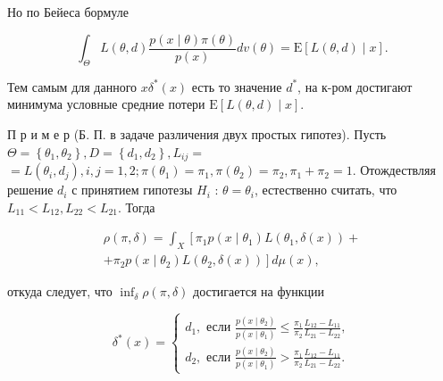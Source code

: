 \documentclass[10pt]{article}
\begin{document}
Но по Бейеса бормуле



\[

\int_{\Theta} L(\theta, d) \frac{p(x \mid \theta) \pi(\theta)}{p(x)} d v(\theta)=\mathrm{E}[L(\theta, d) \mid x] .

\]



Тем самым для данного $x \delta^{*}(x)$ есть то значение $d^{*}$, на к-ром достигают минимума условные средние потери $\mathrm{E}[L(\theta, d) \mid x]$.



П р и м е р (Б. П. в задаче различения двух простых гипотез). Пусть $\Theta=\left\{\theta_{1}, \theta_{2}\right\}, D=\left\{d_{1}, d_{2}\right\}, L_{i j}=$ $=L\left(\theta_{i}, d_{j}\right), i, j=1,2 ; \pi\left(\theta_{1}\right)=\pi_{1}, \pi\left(\theta_{2}\right)=\pi_{2}, \pi_{1}+\pi_{2}=1$. Отождествляя решение $d_{i}$ с принятием гипотезы $H_{i}$ : $\theta=\theta_{i}$, естественно считать, что $L_{11}<L_{12}, L_{22}<L_{21}$. Тогда



\[

\begin{gathered}

\rho(\pi, \delta)=\int_{X}\left[\pi_{1} p\left(x \mid \theta_{1}\right) L\left(\theta_{1}, \delta(x)\right)+\right. \\

\left.+\pi_{2} p\left(x \mid \theta_{2}\right) L\left(\theta_{2}, \delta(x)\right)\right] d \mu(x),

\end{gathered}

\]



откуда следует, что $\inf _{\delta} \rho(\pi, \delta)$ достигается на функции



\[

\delta^{*}(x)=\left\{\begin{array}{l}

d_{1}, \text { если } \frac{p\left(x \mid \theta_{2}\right)}{p\left(x \mid \theta_{1}\right)} \leqslant \frac{\pi_{1}}{\pi_{2}} \frac{L_{12}-L_{11}}{L_{21}-L_{22}}, \\

d_{2}, \text { если } \frac{p\left(x \mid \theta_{2}\right)}{p\left(x \mid \theta_{1}\right)}>\frac{\pi_{1}}{\pi_{2}} \frac{L_{12}-L_{11}}{L_{21}-L_{22}} .

\end{array}\right.

\]
\end{document}
